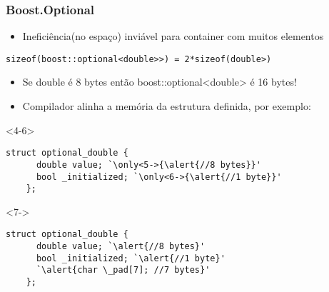 \documentclass[t]{beamer}
\begin{document}
\begin{frame}[fragile]
  \frametitle{Boost.Optional}
  \begin{itemize}
    \item<1->{Ineficiência(no espaço) inviável para container com muitos elementos}
  \end{itemize}
  \begin{lstlisting}[escapeinside=`']
    sizeof(boost::optional<double>>) = 2*sizeof(double>)
  \end{lstlisting}
  \begin{itemize}
    \item<2->{Se double é 8 bytes então boost::optional<double> é 16 bytes!}
    \item<3->{Compilador alinha a memória da estrutura definida, por exemplo:}
  \end{itemize}

  \begin{onlyenv}<4-6>
  \begin{lstlisting}[escapeinside=`']
    struct optional_double {
      double value; `\only<5->{\alert{//8 bytes}}'
      bool _initialized; `\only<6->{\alert{//1 byte}}' 
    };
  \end{lstlisting}
  \end{onlyenv}

  \begin{onlyenv}<7->
  \begin{lstlisting}[escapeinside=`']
    struct optional_double {
      double value; `\alert{//8 bytes}'
      bool _initialized; `\alert{//1 byte}' 
      `\alert{char \_pad[7]; //7 bytes}'
    };
  \end{lstlisting}
  \end{onlyenv}
\end{frame}
\end{document}
